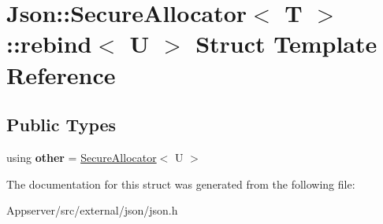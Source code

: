 \hypertarget{structJson_1_1SecureAllocator_1_1rebind}{}\section{Json\+:\+:Secure\+Allocator$<$ T $>$\+:\+:rebind$<$ U $>$ Struct Template Reference}
\label{structJson_1_1SecureAllocator_1_1rebind}
\subsection*{Public Types}
\begin{DoxyCompactItemize}
\item 
using {\bfseries other} = \hyperlink{classJson_1_1SecureAllocator}{Secure\+Allocator}$<$ U $>$\hypertarget{structJson_1_1SecureAllocator_1_1rebind_a010e346391d92ab9f8b0d2e807965615}{}\label{structJson_1_1SecureAllocator_1_1rebind_a010e346391d92ab9f8b0d2e807965615}

\end{DoxyCompactItemize}


The documentation for this struct was generated from the following file\+:\begin{DoxyCompactItemize}
\item 
Appserver/src/external/json/json.\+h\end{DoxyCompactItemize}
